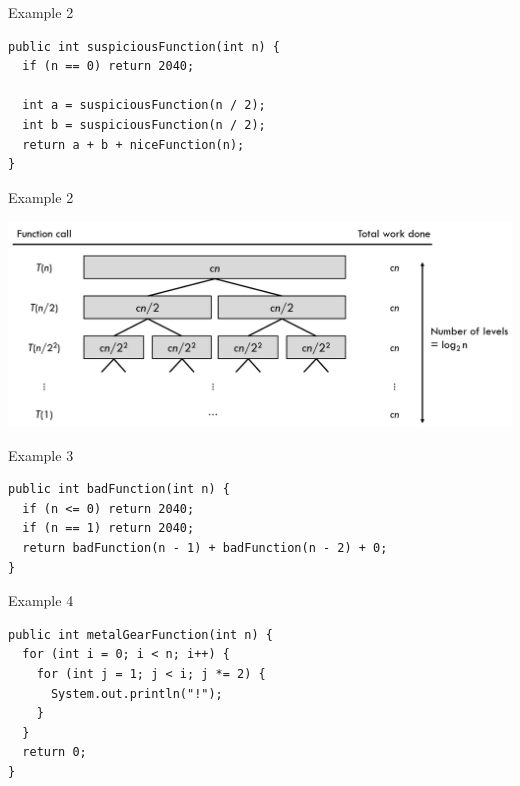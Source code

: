\documentclass[presentation]{beamer}
\begin{document}
\begin{frame}[label={sec:orgee5e06e},fragile]{Example 2}
 \begin{verbatim}
public int suspiciousFunction(int n) {
  if (n == 0) return 2040;

  int a = suspiciousFunction(n / 2);
  int b = suspiciousFunction(n / 2);
  return a + b + niceFunction(n);
}
\end{verbatim}
\end{frame}
\begin{frame}[label={sec:org1d37768}]{Example 2}
\begin{center}
\includegraphics[width=.9\linewidth]{nlogn.png}
\end{center}
\end{frame}
\begin{frame}[label={sec:org5c4d4f7},fragile]{Example 3}
 \begin{verbatim}
public int badFunction(int n) {
  if (n <= 0) return 2040;
  if (n == 1) return 2040;
  return badFunction(n - 1) + badFunction(n - 2) + 0;
}
\end{verbatim}
\end{frame}
\begin{frame}[label={sec:org5090b10},fragile]{Example 4}
 \begin{verbatim}
public int metalGearFunction(int n) {
  for (int i = 0; i < n; i++) {
    for (int j = 1; j < i; j *= 2) {
      System.out.println("!");
    }
  }
  return 0;
}
\end{verbatim}
\end{frame}
\end{document}
